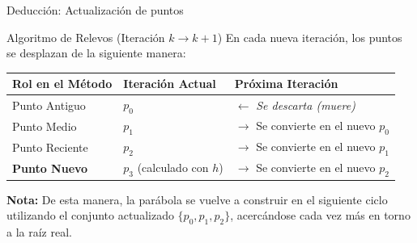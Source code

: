 \documentclass[aspectratio=169, t]{beamer}
\begin{document}
\begin{frame}{Deducción: Actualización de puntos}
    \vspace{-0.2cm}
    \begin{concept}{Algoritmo de Relevos (Iteración $k \to k+1$)}
    En cada nueva iteración, los puntos se desplazan de la siguiente manera:
        
        \vspace{0.1cm}
        \begin{center}
        \renewcommand{\arraystretch}{1.3} 
        \begin{tabular}{lll}
            \toprule
            \textbf{Rol en el Método} & \textbf{Iteración Actual} & \textbf{Próxima Iteración} \\
            \midrule
            Punto Antiguo & $p_0$ & $\leftarrow$ \textit{Se descarta (muere)} \\
            Punto Medio   & $p_1$ & $\rightarrow$ Se convierte en el nuevo $p_0$ \\
            Punto Reciente& $p_2$ & $\rightarrow$ Se convierte en el nuevo $p_1$ \\
            \textbf{Punto Nuevo}  & $p_3$ (calculado con $h$) & $\rightarrow$ Se convierte en el nuevo $p_2$ \\
            \bottomrule
        \end{tabular}
        \end{center}
        \small
        \textbf{Nota:} De esta manera, la parábola se vuelve a construir en el siguiente ciclo utilizando el conjunto actualizado $\{p_0, p_1, p_2\}$, acercándose cada vez más en torno a la raíz real.
    \end{concept}
\end{frame}
\end{document}
